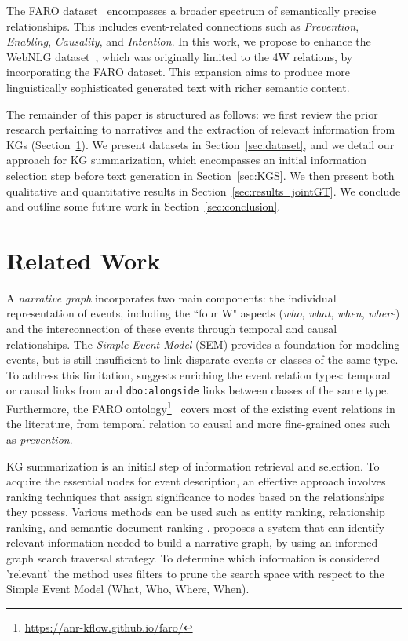 \documentclass[
hf, %
]{ceurart}
\begin{document}
The FARO dataset~\cite{beyond_causality,sem_data_aug} encompasses a broader spectrum of semantically precise relationships. This includes event-related connections such as \textit{Prevention}, \textit{Enabling}, \textit{Causality}, and \textit{Intention}. In this work, we propose to enhance the WebNLG dataset~\cite{gardent-etal-2017-creating}, which was originally limited to the 4W relations, by incorporating the FARO dataset. This expansion aims to produce more linguistically sophisticated generated text with richer semantic content.

The remainder of this paper is structured as follows: we first review the prior research pertaining to narratives and the extraction of relevant information from KGs (Section~\ref{sec:related-work}). We present datasets in Section~\ref{sec:dataset}, and we detail our approach for KG summarization, which encompasses an initial information selection step before text generation in Section~\ref{sec:KGS}. We then present both qualitative and quantitative results in Section~\ref{sec:results_jointGT}. We conclude and outline some future work in Section~\ref{sec:conclusion}.

\section{Related Work }
\label{sec:related-work}
A \textit{narrative graph} \cite{Build_narrative} incorporates two main components: the individual representation of events, including the ``four W" aspects (\textit{who}, \textit{what}, \textit{when}, \textit{where}) and the interconnection of these events through temporal and causal relationships. The \textit{Simple Event Model} (SEM) \cite{SEM} provides a foundation for modeling events, but is still insufficient to link disparate events or classes of the same type. To address this limitation, \citeauthor{Build_narrative} \cite{Build_narrative} suggests enriching the event relation types: temporal or causal links from \citeauthor{allen} \cite{allen} and \texttt{dbo:alongside} links between classes of the same type. Furthermore, the FARO ontology\footnote{\url{https://anr-kflow.github.io/faro/}}~\cite{beyond_causality} covers most of the existing event relations in the literature, from temporal relation to causal and more fine-grained ones such as \textit{prevention}.

KG summarization is an initial step of information retrieval and selection. To acquire the essential nodes for event description, an effective approach involves ranking techniques that assign significance to nodes based on the relationships they possess. Various methods can be used such as entity ranking, relationship ranking, and semantic document ranking \cite{JINDAL2014416}. \cite{graph_traversal} proposes a system that can identify relevant information needed to build a narrative graph, by using an informed graph search traversal strategy. To determine which information is considered 'relevant' the method uses filters to prune the search space with respect to the Simple Event Model (What, Who, Where, When).
\end{document}
